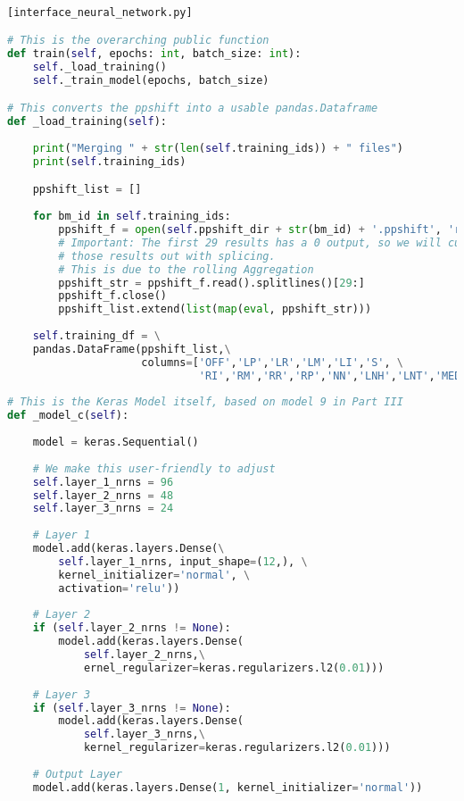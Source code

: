 \begin{lstlisting}[language=Python]

[interface_neural_network.py]

# This is the overarching public function
def train(self, epochs: int, batch_size: int):
    self._load_training()
    self._train_model(epochs, batch_size)

# This converts the ppshift into a usable pandas.Dataframe
def _load_training(self): 
         
    print("Merging " + str(len(self.training_ids)) + " files")
    print(self.training_ids)

    ppshift_list = []
    
    for bm_id in self.training_ids:
        ppshift_f = open(self.ppshift_dir + str(bm_id) + '.ppshift', 'r')
        # Important: The first 29 results has a 0 output, so we will cut
        # those results out with splicing.
        # This is due to the rolling Aggregation
        ppshift_str = ppshift_f.read().splitlines()[29:]
        ppshift_f.close()   
        ppshift_list.extend(list(map(eval, ppshift_str)))
        
    self.training_df = \
    pandas.DataFrame(ppshift_list,\
                     columns=['OFF','LP','LR','LM','LI','S', \
                              'RI','RM','RR','RP','NN','LNH','LNT','MED'])
                              
# This is the Keras Model itself, based on model 9 in Part III
def _model_c(self):
    
    model = keras.Sequential()
    
    # We make this user-friendly to adjust
    self.layer_1_nrns = 96
    self.layer_2_nrns = 48
    self.layer_3_nrns = 24
    
    # Layer 1
    model.add(keras.layers.Dense(\
        self.layer_1_nrns, input_shape=(12,), \
        kernel_initializer='normal', \
        activation='relu'))
        
    # Layer 2 
    if (self.layer_2_nrns != None):
        model.add(keras.layers.Dense(
            self.layer_2_nrns,\
            ernel_regularizer=keras.regularizers.l2(0.01)))
         
    # Layer 3   
    if (self.layer_3_nrns != None):
        model.add(keras.layers.Dense(
            self.layer_3_nrns,\
            kernel_regularizer=keras.regularizers.l2(0.01)))
          
    # Output Layer  
    model.add(keras.layers.Dense(1, kernel_initializer='normal'))


\end{lstlisting}
